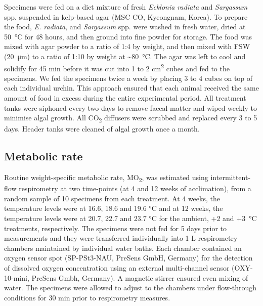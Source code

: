 \documentclass[a4paper,10pt, oneside]{memoir}
\begin{document}
Specimens were fed on a diet mixture of fresh \textit{Ecklonia radiata} and \textit{Sargassum} spp. suspended in kelp-based agar (MSC CO, Kyeongnam, Korea).
To prepare the food, \textit{E. radiata}, and \textit{Sargassum} spp. were washed in fresh water, dried at \SI{50}{\celsius} for 48 hours, and then ground into fine powder for storage.
The food was mixed with agar powder to a ratio of 1:4 by weight, and then mixed with FSW (\SI{20}{\micro\m}) to a ratio of 1:10 by weight at \si{\sim}\SI{80}{\celsius}. The agar was left to cool and solidify for 45 min before it was cut into 1 to 2 cm\textsuperscript{2} cubes and fed to the specimens.
We fed the specimens twice a week by placing 3 to 4 cubes on top of each individual urchin.
This approach ensured that each animal received the same amount of food in excess during the entire experimental period.
All treatment tanks were siphoned every two days to remove faecal matter and wiped weekly to minimise algal growth.
All CO\textsubscript{2} diffusers were scrubbed and replaced every 3 to 5 days.
Header tanks were cleaned of algal growth once a month.

\hypertarget{metabolic-rate-2}{%
\subsection{Metabolic rate}\label{metabolic-rate-2}}

Routine weight-specific metabolic rate, MO\textsubscript{2}, was estimated using intermittent-flow respirometry at two time-points (at 4 and 12 weeks of acclimation), from a random sample of 10 specimens from each treatment.
At 4 weeks, the temperature levels were at 16.6, 18.6 and 19.6 \si{\celsius} and at 12 weeks, the temperature levels were at 20.7, 22.7 and 23.7 \si{\celsius} for the ambient, +2 and +\SI{3}{\celsius} treatments, respectively.
The specimens were not fed for 5 days prior to measurements and they were transferred individually into 1 L respirometry chambers maintained by individual water baths.
Each chamber contained an oxygen sensor spot (SP-PSt3-NAU, PreSens GmbH, Germany) for the detection of dissolved oxygen concentration using an external multi-channel sensor (OXY-10-mini, PreSens Gmbh, Germany).
A magnetic stirrer ensured even mixing of water. The specimens were allowed to adjust to the chambers under flow-through conditions for 30 min prior to respirometry measures.
\end{document}
